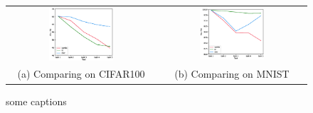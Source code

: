 \documentclass[final]{cvpr}
\begin{document}
\begin{figure}[t]
    \centering
	\begin{tabular}{c@{\hskip0.5cm}c}
		\includegraphics[width=0.45\textwidth]{resources/comp_CIFAR.eps}&%
        \includegraphics[width=0.45\textwidth]{resources/comp_MNIST.eps}\\%
        (a) Comparing on CIFAR100 & (b) Comparing on MNIST\\
	\end{tabular}\vspace{0.2cm}
	\caption{some captions}
\end{figure}


{\small


}
\end{document}
